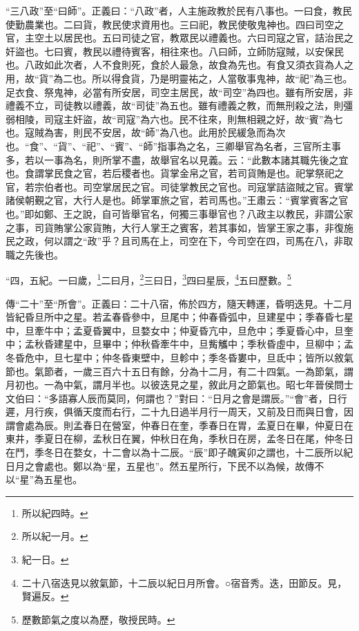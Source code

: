 {\noindent\shu{}\fzkt “三八政”至“曰師”。正義曰：“八政”者，人主施政教於民有八事也。一曰食，教民使勤農業也。二曰貨，教民使求資用也。三曰祀，教民使敬鬼神也。四曰司空之官，主空土以居民也。五曰司徒之官，教眾民以禮義也。六曰司寇之官，詰治民之奸盜也。七曰賓，教民以禮待賓客，相往來也。八曰師，立師防寇賊，以安保民也。八政如此次者，人不食則死，食於人最急，故食為先也。有食又須衣貨為人之用，故“貨”為二也。所以得食貨，乃是明靈祐之，人當敬事鬼神，故“祀”為三也。足衣食、祭鬼神，必當有所安居，司空主居民，故“司空”為四也。雖有所安居，非禮義不立，司徒教以禮義，故“司徒”為五也。雖有禮義之教，而無刑殺之法，則彊弱相陵，司寇主奸盜，故“司寇”為六也。民不往來，則無相親之好，故“賓”為七也。寇賊為害，則民不安居，故“師”為八也。此用於民緩急而為次也。“食”、“貨”、“祀”、“賓”、“師”指事為之名，三卿舉官為名者，三官所主事多，若以一事為名，則所掌不盡，故舉官名以見義。云：“此數本諸其職先後之宜也。食謂掌民食之官，若后稷者也。貨掌金帛之官，若司貨賄是也。祀掌祭祀之官，若宗伯者也。司空掌居民之官。司徒掌教民之官也。司寇掌詰盜賊之官。賓掌諸侯朝覲之官，大行人是也。師掌軍旅之官，若司馬也。”王肅云：“賓掌賓客之官也。”即如鄭、王之說，自可皆舉官名，何獨三事舉官也？八政主以教民，非謂公家之事，司貨賄掌公家貨賄，大行人掌王之賓客，若其事如，皆掌王家之事，非復施民之政，何以謂之“政”乎？且司馬在上，司空在下，今司空在四，司馬在八，非取職之先後也。 \par}

“四，五紀。一曰歲，\footnote{所以紀四時。}二曰月，\footnote{所以紀一月。}三曰日，\footnote{紀一日。}四曰星辰，\footnote{二十八宿迭見以敘氣節，十二辰以紀日月所會。○宿音秀。迭，田節反。見，賢遍反。}五曰歷數。\footnote{歷數節氣之度以為歷，敬授民時。}

{\noindent\zhuan{}\fzbyks 傳“二十”至“所會”。正義曰：二十八宿，佈於四方，隨天轉運，昏明迭見。十二月皆紀昏旦所中之星。若孟春昏參中，旦尾中；仲春昏弧中，旦建星中；季春昏七星中，旦牽牛中；孟夏昏翼中，旦婺女中；仲夏昏亢中，旦危中；季夏昏心中，旦奎中；孟秋昏建星中，旦畢中；仲秋昏牽牛中，旦觜觿中；季秋昏虛中，旦柳中；孟冬昏危中，旦七星中；仲冬昏東壁中，旦軫中；季冬昏婁中，旦氐中；皆所以敘氣節也。氣節者，一歲三百六十五日有餘，分為十二月，有二十四氣。一為節氣，謂月初也。一為中氣，謂月半也。以彼迭見之星，敘此月之節氣也。昭七年晉侯問士文伯曰：“多語寡人辰而莫同，何謂也？”對曰：“日月之會是謂辰。”“會”者，日行遲，月行疾，俱循天度而右行，二十九日過半月行一周天，又前及日而與日會，因謂會處為辰。則孟春日在營室，仲春日在奎，季春日在胃，孟夏日在畢，仲夏日在東井，季夏日在柳，孟秋日在翼，仲秋日在角，季秋日在房，孟冬日在尾，仲冬日在鬥，季冬日在婺女，十二會以為十二辰。“辰”即子醜寅卯之謂也，十二辰所以紀日月之會處也。鄭以為“星，五星也”。然五星所行，下民不以為候，故傳不以“星”為五星也。 \par}

